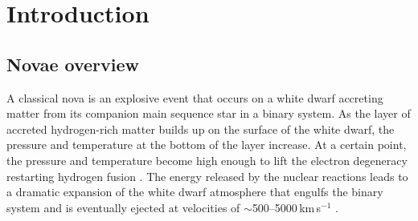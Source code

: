 \documentclass[twocolumn]{aastex631}
\begin{document}


\section{Introduction}
\label{sec:intro}

\subsection{Novae overview}
\label{sec:innova}

A classical nova is an explosive event that occurs on a white dwarf
accreting matter from its companion main sequence star in a binary system.
As the layer of accreted hydrogen-rich matter builds up on the surface of the white
dwarf, the pressure and temperature at the bottom of the layer increase.
At a certain point, the pressure and temperature become high enough to lift 
the electron degeneracy restarting hydrogen fusion 
\citep[e.g.,][]{2008clno.book.....B,2016PASP..128e1001S,2020ApJ...895...70S,2020A&ARv..28....3D}. 
The energy released by the nuclear reactions leads to a dramatic expansion of the white dwarf
atmosphere that engulfs the binary system and is eventually ejected 
at velocities of $\sim$500--5000\,km\,s$^{-1}$ \citep{1895Obs....18..436P,1956VA......2.1477M,2020ApJ...905...62A}.
\end{document}

